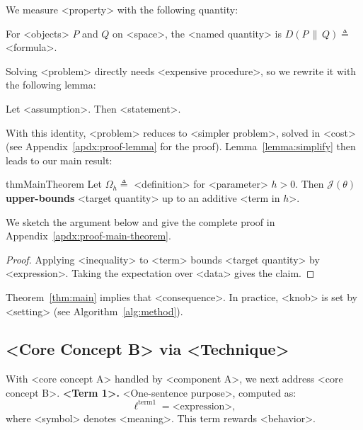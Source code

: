 We measure <property> with the following quantity:
\begin{definition} \label{def:concept}
For <objects> $P$ and $Q$ on <space>, the <named quantity> is $D(P \,\|\, Q) \triangleq$ <formula>.
\end{definition}
Solving <problem> directly needs <expensive procedure>, so we rewrite it with the following lemma:
\begin{lemma} \label{lemma:simplify}
Let <assumption>. Then <statement>.
\end{lemma}
With this identity, <problem> reduces to <simpler problem>, solved in <cost> (see Appendix~\ref{apdx:proof-lemma} for the proof).
Lemma~\ref{lemma:simplify} then leads to our main result:
\begin{restatable}{thm}{MainTheorem} \label{thm:main}
Let $\Omega_h \triangleq$ <definition> for <parameter> $h > 0$.
Then $\mathcal{J}(\theta)$ \textbf{upper-bounds} <target quantity> up to an additive <term in $h$>.
\end{restatable}
We sketch the argument below and give the complete proof in Appendix~\ref{apdx:proof-main-theorem}.
\begin{proof}
Applying <inequality> to <term> bounds <target quantity> by <expression>. Taking the expectation over <data> gives the claim.
\end{proof}
Theorem~\ref{thm:main} implies that <consequence>. In practice, <knob> is set by <setting> (see Algorithm~\ref{alg:method}).

\subsection{<Core Concept B> via <Technique>} \label{sec:method-b}
With <core concept A> handled by <component A>, we next address <core concept B>.
\textbf{<Term 1>.} <One-sentence purpose>, computed as:
\begin{equation} \label{eq:term-1}
    \ell^{\text{term1}} = \text{<expression>},
\end{equation}
where <symbol> denotes <meaning>. This term rewards <behavior>.

